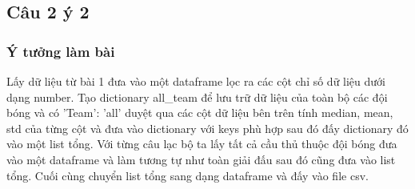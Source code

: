 \subsection{Câu 2 ý 2}
\subsubsection{Ý tưởng làm bài}
Lấy dữ liệu từ bài 1 đưa vào một dataframe lọc ra các cột chỉ số dữ liệu dưới dạng number. Tạo dictionary all\_team để lưu trữ dữ liệu của toàn bộ các đội bóng và có 'Team': 'all' duyệt qua các cột dữ liệu bên trên tính median, mean, std của từng cột và đưa vào dictionary với keys phù hợp sau đó đấy dictionary đó vào một list tổng. Với từng câu lạc bộ ta lấy tất cả cầu thủ thuộc đội bóng đưa vào một dataframe và làm tương tự như toàn giải đấu sau đó cũng đưa vào list tổng. Cuối cùng chuyển list tổng sang dạng dataframe và đấy vào file csv.
